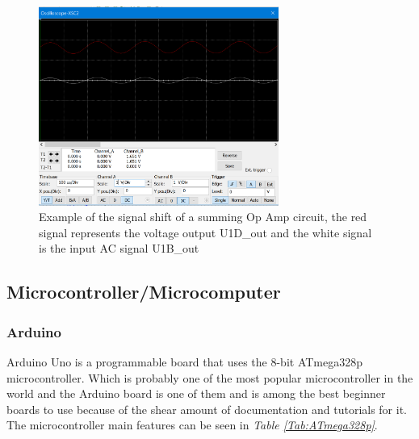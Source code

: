 \begin{figure}[h]
    \centering
    \includegraphics[width=0.70\textwidth]{graphics/summingShift1.png}
    \caption{Example of the signal shift of a summing Op Amp circuit, the red signal represents the voltage output U1D\_out and the white signal is the input AC signal U1B\_out}
    \label{fig:SummingOpAmpShift1}
\end{figure}


\clearpage


\subsection{Microcontroller/Microcomputer}%


\subsubsection{Arduino}

Arduino Uno is a programmable board that uses the 8-bit ATmega328p microcontroller.
Which is probably one of the most popular microcontroller in the world and the Arduino board is one of them and is among the best beginner boards to use because of the shear amount of documentation and tutorials for it.
The microcontroller main features can be seen in \textit{Table \ref{Tab:ATmega328p}}.


